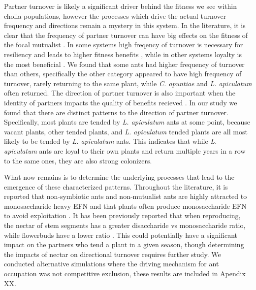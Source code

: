 \documentclass[11pt]{article}
\begin{document}
Partner turnover is likely a significant driver behind the fitness we see within cholla populations, however the processes which drive the actual turnover frequency and directions remain a mystery in this system.
In the literature, it is clear that the frequency of partner turnover can have big effects on the fitness of the focal mutualist \cite{Fiala1994, Horvitz1986, Oliveira1999, Sachs2004}.
In some systems high freqency of turnover is necessary for resiliency and leads to higher fitness benefits \cite{Trojelsgaard2015}, while in other systems loyalty is the most beneficial \cite{Batstone2018}.
We found that some ants had higher frequency of turnover than others, specifically the other category appeared to have high frequency of turnover, rarely returning to the same plant, while \textit{C. opuntiae} and \textit{L. apiculatum} often returned.
The direction of partner turnover is also important when the identity of partners impacts the quality of benefits recieved \cite{Fonseca2003, Alonso1998, Dejean2008, Noe1994}.
In our study we found that there are distinct patterns to the direction of partner turnover. 
Specifically, most plants are tended by \textit{L. apiculatum} ants at some point, because vacant plants, other tended plants, and \textit{L. apiculatum} tended plants are all most likely to be tended by \textit{L. apiculatum} ants.
This indicates that while \textit{L. apiculatum} ants are loyal to their own plants and return multiple years in a row to the same ones, they are also strong colonizers. 

What now remains is to determine the underlying processes that lead to the emergence of these characterized patterns. 
Throughout the literature, it is reported that non-symbiotic ants and non-mutualist ants are highly attracted to monosaccharide heavy EFN \citep{Heil2004,Kautz2009} and that plants often produce monosaccharide EFN to avoid exploitation \citep{Heil2010}.
It has been previously reported that when reproducing, the nectar of stem segments has a greater disaccharide vs monosaccharide ratio, while flowerbuds have a lower ratio \citep{Miller2008}. 
This could potentially have a significant impact on the partners who tend a plant in a given season, though determining the impacts of nectar on directional turnover requires further study. 
We conducted alternative simulations where the driving mechanism for ant occupation was not competitive exclusion, these results are included in Apendix XX.
\end{document}
